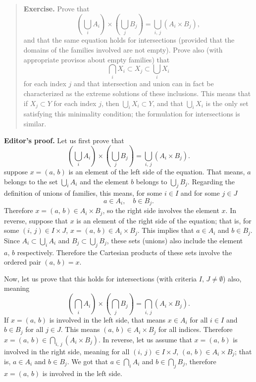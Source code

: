 \begin{quote}
	\textbf{Exercise.} Prove that
	\[
		\left( \bigcup_i A_i \right) \times \left( \bigcup_j B_j\right) = \bigcup_{i, \,j} (A_i \times B_j),
	\]
	and that the same equation holds for intersections (provided that the domains of the families involved are not empty). Prove also (with appropriate provisos about empty families) that 
	\[
		\bigcap_i X_i \subset X_j \subset \bigcup_i X_i
	\]
	for each index $j$ and that intersection and union can in fact be characterized as the extreme solutions of these inclusions. This means that if $X_j \subset Y$ for each index $j$, then $\bigcup_i X_i \subset Y$, and that $\bigcup_i X_i$ is the only set satisfying this minimality condition; the formulation for intersections is similar.
\end{quote}

\textbf{Editor's proof.} Let us first prove that
\[
 \left( \bigcup_i A_i \right) \times \left( \bigcup_j B_j\right) = \bigcup_{i, \,j} (A_i \times B_j).
\]
suppose $x = (a, \, b)$ is an element of the left side of the equation. That means, $a$ belongs to the set $\bigcup_i A_i$ and the element $b$ belongs to $\bigcup_j B_j$. Regarding the definition of unions of families, this means, for some $i \in I$ and for some $j \in J$
\[
	a \in A_i, \quad b \in B_j.
\]
Therefore $x = (a, \, b) \in A_i \times B_j$, so the right side involves the element $x$. In reverse, suppose that $x$ is an element of the right side of the equation; that is, for some $(i, \, j) \in I \times J$, $x = (a, \, b) \in A_i \times B_j$. This implies that $a \in A_i$ and $b \in B_j$. Since $A_i \subset \bigcup_i A_i$ and $B_j \subset \bigcup_j B_j$, these sets (unions) also include the element $a, \, b$ respectively. Therefore the Cartesian products of these sets involve the ordered pair $(a, \, b) = x$.

Now, let us prove that this holds for intersections (with criteria $I, \, J \neq \emptyset$) also, meaning
\[
\left( \bigcap_i A_i \right) \times \left( \bigcap_j B_j\right) = \bigcap_{i, \,j} (A_i \times B_j).
\]
If $x = (a, \, b)$ is involved in the left side, that means $x \in A_i$ for all $i \in I$ and $b \in B_j$ for all $j \in J$. This means $(a, \, b) \in A_i \times B_j$ for all indices. Therefore $x = (a, \, b) \in \bigcap_{i, \, j} (A_i \times B_j)$. In reverse, let us assume that $x = (a, \, b)$ is involved in the right side, meaning for all $(i, \, j) \in I \times J$, $(a, \, b) \in A_i \times B_j$; that is, $a \in A_i$ and $b \in B_j$. We got that $a \in \bigcap_i A_i$ and $b \in \bigcap_j B_j$, therefore $x = (a, \, b)$ is involved in the left side.

